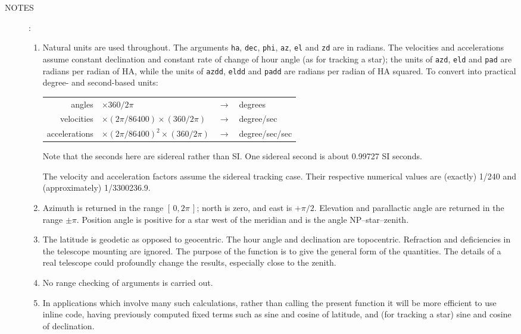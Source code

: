 \documentclass[11pt,fleqn,twoside]{article}
\renewcommand{\_}{{\tt\char'137}}     %
\newlength{\oldspacing}
\newcommand{\notes}[1]
{
  \goodbreak
  \setlength{\oldspacing}{\topsep}
  \setlength{\topsep}{0.3ex}
  \begin{description}
    \item[NOTES]:
        #1
  \end{description}
  \setlength{\topsep}{\oldspacing}
}
\begin{document}
\notes
{
 \begin{enumerate}
  \setlength{\parskip}{\medskipamount}
  \item Natural units are used throughout.
        The arguments {\tt ha}, {\tt dec}, {\tt phi}, {\tt az}, {\tt el}
        and {\tt zd} are in radians.  The velocities and accelerations
        assume constant declination and constant rate of change of
        hour angle (as for tracking a star);  the units of
        {\tt azd}, {\tt eld} and {\tt pad} are radians per radian of HA,
        while the units of {\tt azdd}, {\tt eldd} and {\tt padd} are
        radians per radian of HA squared.  To
        convert into practical degree- and second-based units:
 
        \begin{center}
        \begin{tabular}{rlcl}
                  angles & $\times 360/2\pi$ & $\rightarrow$ & degrees \\
              velocities & $\times (2\pi/86400) \times (360/2\pi)$
                                             & $\rightarrow$ & degree/sec \\
           accelerations & $\times (2\pi/86400)^2 \times (360/2\pi)$
                                             & $\rightarrow$ & degree/sec/sec \\
        \end{tabular}
        \end{center}
 
        Note that the seconds here are sidereal rather than SI.  One
        sidereal second is about 0.99727 SI seconds.
 
        The velocity and acceleration factors assume the sidereal
        tracking case.  Their respective numerical values are (exactly)
        1/240 and (approximately) 1/3300236.9.
  \item Azimuth is returned in the range $[\,0,2\pi\,]$;  north is zero,
        and east is $+\pi/2$.  Elevation and parallactic angle are
        returned in the range $\pm\pi$.  Position angle is positive
        for a star west of the meridian and is the angle NP--star--zenith.
  \item The latitude is geodetic as opposed to geocentric.  The
        hour angle and declination are topocentric.  Refraction and
        deficiencies in the telescope mounting are ignored.  The
        purpose of the function is to give the general form of the
        quantities.  The details of a real telescope could profoundly
        change the results, especially close to the zenith.
  \item No range checking of arguments is carried out.
  \item In applications which involve many such calculations, rather
        than calling the present function it will be more efficient to
        use inline code, having previously computed fixed terms such
        as sine and cosine of latitude, and (for tracking a star)
        sine and cosine of declination.
 \end{enumerate}
}
\end{document}
